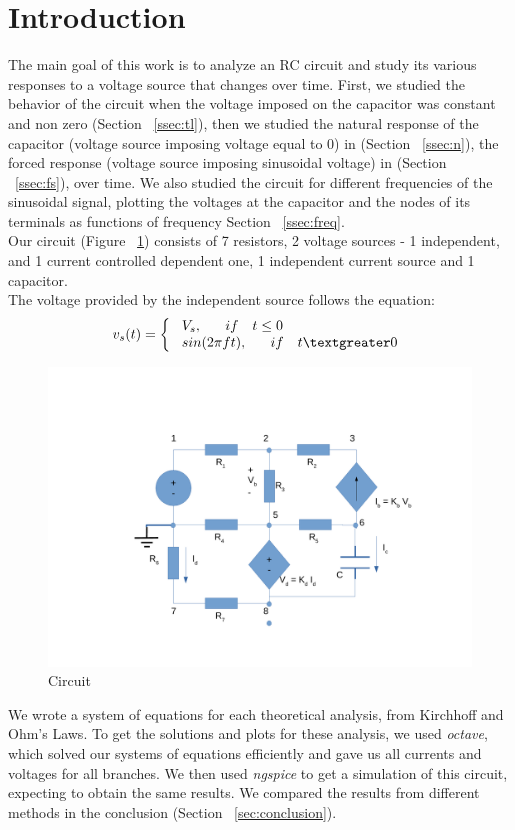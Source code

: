 \section{Introduction}
\label{sec:intro}
The main goal of this work is to analyze an RC circuit and study its various responses to a voltage source that changes over time. First, we studied the behavior of the circuit when the voltage imposed on the capacitor was constant and non zero (Section ~\ref{ssec:tl}), then we studied the natural response of the capacitor (voltage source imposing voltage equal to 0) in (Section ~\ref{ssec:n}), the forced response (voltage source imposing sinusoidal voltage) in (Section ~\ref{ssec:fs}), over time. We also studied the circuit for different frequencies of the sinusoidal signal, plotting the voltages at the capacitor and the nodes of its terminals as functions of frequency Section ~\ref{ssec:freq}.\\

Our circuit (Figure ~\ref{fig:circuit}) consists of 7 resistors, 2 voltage sources - 1 independent, and 1 current controlled dependent one, 1 independent current source and 1 capacitor.\\
The voltage provided by the independent source follows the equation:
\begin{equation}\label{eqn:vss}
\begin{split}
{v_s (t)} = \left\{\begin{array}{ll} \ V_s ,  \quad \ \  if \ \  \ t \leq 0 \\ 
 \ sin(2 \pi f t) , \quad \ \  if \ \ \ t \textgreater 0 \end{array} \right.
  \end{split}
\end{equation}
\begin{figure}[H] \centering
\includegraphics[width=0.8\linewidth]{circuito.pdf}
\caption{Circuit}
\label{fig:circuit}
\end{figure} 
We wrote a system of equations for each theoretical analysis, from Kirchhoff and Ohm's Laws. To get the solutions and plots for these analysis, we used \textit{octave}, which solved our systems of equations efficiently and gave us all currents and voltages for all branches. We then used \textit{ngspice} to get a simulation of this circuit, expecting to obtain the same results. We compared the results from different methods in the conclusion (Section ~\ref{sec:conclusion}).

